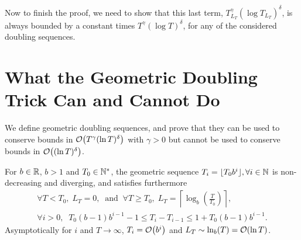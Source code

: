 \documentclass[12pt]{colt2018} %
\begin{document}
Now to finish the proof, we need to show that this last term, $T_{L_T}^{\gamma} (\log T_{L_T})^{\delta}$, is always bounded by a constant times $T^{\gamma} (\log T)^{\delta}$,
for any of the considered doubling sequences.



\section{What the Geometric Doubling Trick Can and Cannot Do}\label{sec:geometricDoublingTrick}

We define geometric doubling sequences, and prove that they can be used
to conserve bounds in $\mathop{}\mathopen{}\mathcal{O}\mathopen{}\left(T^{\gamma}(\ln T)^{\delta}\right)$ with $\gamma>0$ but cannot be used to conserve bounds in $\mathop{}\mathopen{}\mathcal{O}\mathopen{}\left((\ln T)^{\delta}\right)$.



\begin{definition}\label{def:geomSequence}
    For $b\in\mathbb{R}$, $b>1$ and $T_0\in\mathbb{N}^*$,
    the geometric sequence $T_i = \lfloor T_0 b^i \rfloor, \forall i \in \mathbb{N}$
    is non-decreasing and diverging,
    and satisfies furthermore
    \vspace*{-10pt}  %
    \begin{align}
        \forall T < T_0,\;
        L_{T} = 0,
        \;\;\text{and}\;\;
        \forall T \geq T_0,\;
        L_T = \left\lceil \log_b\left( \frac{T}{T_0} \right) \right\rceil, \label{eq:geomSequence2} \\
        \forall i > 0,\;\;
        T_0 (b - 1) b^{i-1} - 1
        \leq T_i - T_{i-1}
        \leq 1 + T_0 (b - 1) b^{i-1}. \label{eq:geomSequence1}
    \end{align}
    Asymptotically for $i$ and $T\to\infty$,
    $T_i = \mathop{}\mathopen{}\mathcal{O}\mathopen{}\left(b^i\right)$ and
    $L_T \sim \ln_b(T) = \mathop{}\mathopen{}\mathcal{O}\mathopen{}\left(\ln T\right)$.
\end{definition}
\end{document}
